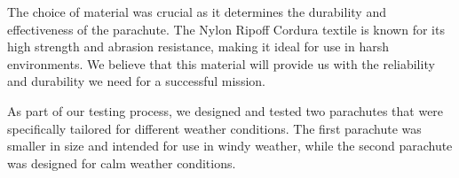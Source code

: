 \documentclass[11pt]{article}
\begin{document}
The choice of material was crucial as it determines the durability and effectiveness of the parachute. The Nylon Ripoff Cordura textile is known for its high strength and abrasion resistance, making it ideal for use in harsh environments. We believe that this material will provide us with the reliability and durability we need for a successful mission.

As part of our  testing process, we designed and tested two parachutes that were specifically tailored for different weather conditions. The first parachute was smaller in size and intended for use in windy weather, while the second parachute was designed for calm weather conditions.


\end{document}
